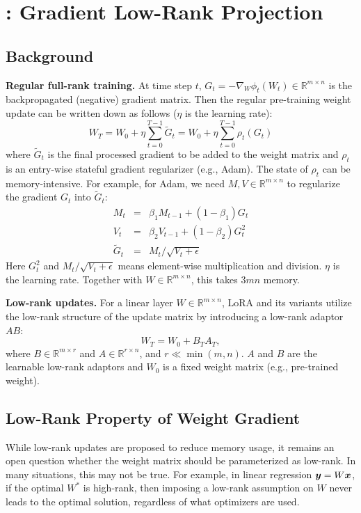 \def\cG{\mathcal{G}}
\def\rr{\mathbb{R}}

\section{\lowrank: Gradient Low-Rank Projection}
\subsection{Background}

\textbf{Regular full-rank training.} At time step $t$, $G_t = -\nabla_W \phi_t(W_t) \in \rr^{m \times n}$ is the backpropagated (negative) gradient matrix. Then the regular pre-training weight update can be written down as follows ($\eta$ is the learning rate):
\begin{equation}
    W_T = W_0 + \eta \sum_{t=0}^{T-1} \tilde G_{t} = W_0 + \eta\sum_{t=0}^{T-1} \rho_t(G_t)
\end{equation}
where $\tilde G_t$ is the final processed gradient to be added to the weight matrix and $\rho_t$ is an entry-wise stateful gradient regularizer (e.g., Adam). The state of $\rho_t$ can be memory-intensive. For example, for Adam, we need $M,V \in \rr^{m\times n}$ to regularize the gradient $G_t$ into $\tilde G_{t}$:
\begin{eqnarray}
    M_t &=& \beta_1 M_{t-1} + (1-\beta_1) G_t \\  
    V_t &=& \beta_2 V_{t-1} + (1-\beta_2) G^2_t  \\
    \tilde G_t &=& M_t / \sqrt{V_t + \epsilon}
\end{eqnarray}
Here $G_t^2$ and $M_t / \sqrt{V_t + \epsilon}$ means element-wise multiplication and division. $\eta$ is the learning rate. Together with $W\in \rr^{m\times n}$, this takes $3mn$ memory. 

\textbf{Low-rank updates.} For a linear layer $W \in \mathbb{R}^{m \times n}$, LoRA and its variants utilize the low-rank structure of the update matrix by introducing a low-rank adaptor $AB$:
\begin{equation}
    W_T = W_0 + B_{T}A_{T},
\end{equation}
where $B \in \mathbb{R}^{m \times r}$ and $A \in \mathbb{R}^{r \times n}$, and $r \ll \min(m, n)$. $A$ and $B$ are the learnable low-rank adaptors and $W_0$ is a fixed weight matrix (e.g., pre-trained weight).

\subsection{Low-Rank Property of Weight Gradient}
While low-rank updates are proposed to reduce memory usage, it remains an open question whether the weight matrix should be parameterized as low-rank. In many situations, this may not be true. For example, in linear regression ${\bm{y}} = W{\bm{x}}$, if the optimal $W^*$ is high-rank, then imposing a low-rank assumption on $W$ never leads to the optimal solution, regardless of what optimizers are used. 

